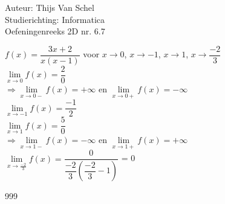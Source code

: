 \documentclass[a4paper]{article}
\begin{document}
  
\noindent \large Auteur: Thijs Van Schel \\
\noindent \large Studierichting: Informatica\\
\noindent \large Oefeningenreeks 2D nr. 6.7\\

\medskip

\normalsize

$f(x) = \dfrac{3x+2}{x(x-1)}$ voor $x\rightarrow 0$, $x\rightarrow -1$, $x\rightarrow 1$, $x\rightarrow \dfrac{-2}{3}$\\

$\lim\limits_{x\rightarrow 0} f(x) = \dfrac{2}{0}$\\

$\Rightarrow \lim\limits_{x\rightarrow 0-} f(x) = +\infty$ en $\lim\limits_{x\rightarrow 0+} f(x) = -\infty$\\

$\lim\limits_{x\rightarrow -1} f(x) = \dfrac{-1}{2}$\\

$\lim\limits_{x\rightarrow 1} f(x) = \dfrac{5}{0}$\\

$\Rightarrow \lim\limits_{x\rightarrow 1-} f(x) = -\infty$ en $\lim\limits_{x\rightarrow 1+} f(x) = +\infty$\\

$\lim\limits_{x\rightarrow \tfrac{-2}{3}} f(x) = \dfrac{0}{\dfrac{-2}{3}\left(\dfrac{-2}{3}-1\right)}$ = 0\\


\begin{thebibliography}{999}
\end{thebibliography}
\end{document}
